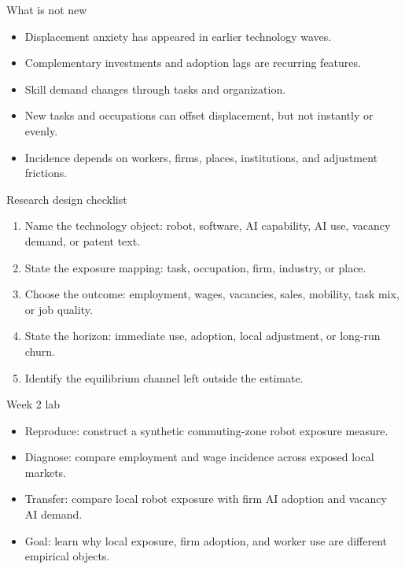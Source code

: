 \documentclass[aspectratio=169,11pt]{beamer}
\begin{document}
\begin{frame}{What is not new}
\begin{itemize}
    \item Displacement anxiety has appeared in earlier technology waves.
    \item Complementary investments and adoption lags are recurring features.
    \item Skill demand changes through tasks and organization.
    \item New tasks and occupations can offset displacement, but not instantly or evenly.
    \item Incidence depends on workers, firms, places, institutions, and adjustment frictions.
\end{itemize}
\end{frame}

\begin{frame}{Research design checklist}
\begin{enumerate}
    \item Name the technology object: robot, software, AI capability, AI use, vacancy demand, or patent text.
    \item State the exposure mapping: task, occupation, firm, industry, or place.
    \item Choose the outcome: employment, wages, vacancies, sales, mobility, task mix, or job quality.
    \item State the horizon: immediate use, adoption, local adjustment, or long-run churn.
    \item Identify the equilibrium channel left outside the estimate.
\end{enumerate}
\end{frame}

\begin{frame}{Week 2 lab}
\begin{itemize}
    \item Reproduce: construct a synthetic commuting-zone robot exposure measure.
    \item Diagnose: compare employment and wage incidence across exposed local markets.
    \item Transfer: compare local robot exposure with firm AI adoption and vacancy AI demand.
    \item Goal: learn why local exposure, firm adoption, and worker use are different empirical objects.
\end{itemize}
\end{frame}
\end{document}
